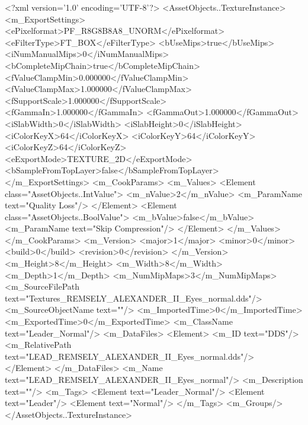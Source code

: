 <?xml version='1.0' encoding='UTF-8'?>
<AssetObjects..TextureInstance>
  <m_ExportSettings>
    <ePixelformat>PF_R8G8B8A8_UNORM</ePixelformat>
    <eFilterType>FT_BOX</eFilterType>
    <bUseMips>true</bUseMips>
    <iNumManualMips>0</iNumManualMips>
    <bCompleteMipChain>true</bCompleteMipChain>
    <fValueClampMin>0.000000</fValueClampMin>
    <fValueClampMax>1.000000</fValueClampMax>
    <fSupportScale>1.000000</fSupportScale>
    <fGammaIn>1.000000</fGammaIn>
    <fGammaOut>1.000000</fGammaOut>
    <iSlabWidth>0</iSlabWidth>
    <iSlabHeight>0</iSlabHeight>
    <iColorKeyX>64</iColorKeyX>
    <iColorKeyY>64</iColorKeyY>
    <iColorKeyZ>64</iColorKeyZ>
    <eExportMode>TEXTURE_2D</eExportMode>
    <bSampleFromTopLayer>false</bSampleFromTopLayer>
  </m_ExportSettings>
  <m_CookParams>
    <m_Values>
      <Element class="AssetObjects..IntValue">
        <m_nValue>2</m_nValue>
        <m_ParamName text="Quality Loss"/>
      </Element>
      <Element class="AssetObjects..BoolValue">
        <m_bValue>false</m_bValue>
        <m_ParamName text="Skip Compression"/>
      </Element>
    </m_Values>
  </m_CookParams>
  <m_Version>
    <major>1</major>
    <minor>0</minor>
    <build>0</build>
    <revision>0</revision>
  </m_Version>
  <m_Height>8</m_Height>
  <m_Width>8</m_Width>
  <m_Depth>1</m_Depth>
  <m_NumMipMaps>3</m_NumMipMaps>
  <m_SourceFilePath text="Textures\LEAD_REMSELY_ALEXANDER_II_Eyes_normal.dds"/>
  <m_SourceObjectName text=""/>
  <m_ImportedTime>0</m_ImportedTime>
  <m_ExportedTime>0</m_ExportedTime>
  <m_ClassName text="Leader_Normal"/>
  <m_DataFiles>
    <Element>
      <m_ID text="DDS"/>
      <m_RelativePath text="LEAD_REMSELY_ALEXANDER_II_Eyes_normal.dds"/>
    </Element>
  </m_DataFiles>
  <m_Name text="LEAD_REMSELY_ALEXANDER_II_Eyes_normal"/>
  <m_Description text=""/>
  <m_Tags>
    <Element text="Leader_Normal"/>
    <Element text="Leader"/>
    <Element text="Normal"/>
  </m_Tags>
  <m_Groups/>
</AssetObjects..TextureInstance>
